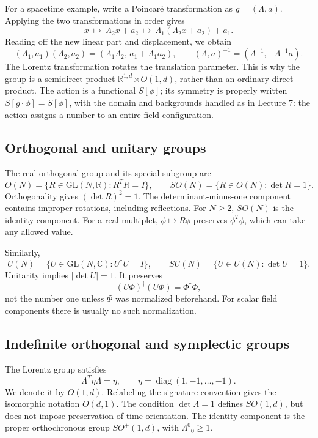 \documentclass[11pt]{article}
\newcommand{\R}{\mathbb{R}}
\newcommand{\C}{\mathbb C}
\newcommand{\GL}{\mathrm{GL}}
\begin{document}
For a spacetime example, write a Poincar\'e transformation as
\(g=(\Lambda,a)\). Applying the two transformations in order gives
\[
 x\ \longmapsto\ \Lambda_2x+a_2
 \ \longmapsto\ \Lambda_1(\Lambda_2x+a_2)+a_1.
\]
Reading off the new linear part and displacement, we obtain
\begin{equation}
(\Lambda_1,a_1)(\Lambda_2,a_2)
=(\Lambda_1\Lambda_2,\,a_1+\Lambda_1a_2),\qquad
(\Lambda,a)^{-1}=(\Lambda^{-1},-\Lambda^{-1}a).
\label{eq:PoincareProduct}
\end{equation}
The Lorentz transformation rotates the translation parameter. This is
why the group is a semidirect product
\(\R^{1,d}\rtimes O(1,d)\), rather than an ordinary direct product.
The action is a functional \(S[\phi]\); its symmetry is properly written
\(S[g\cdot\phi]=S[\phi]\), with the domain and backgrounds handled
as in Lecture 7: the action assigns a number to an entire field
configuration.

\subsection{Orthogonal and unitary groups}
The real orthogonal group and its special subgroup are
\begin{equation}
O(N)=\{R\in\GL(N,\R):R^TR=I\},\qquad
SO(N)=\{R\in O(N):\det R=1\}.
\end{equation}
Orthogonality gives \((\det R)^2=1\). The determinant-minus-one
component contains improper rotations, including reflections. For
\(N\ge2\), \(SO(N)\) is the identity component. For a real multiplet, \(\phi\mapsto R\phi\) preserves
\(\phi^T\phi\), which can take any allowed value.

Similarly,
\begin{equation}
U(N)=\{U\in\GL(N,\C):U^\dagger U=I\},\qquad
SU(N)=\{U\in U(N):\det U=1\}.
\end{equation}
Unitarity implies \(|\det U|=1\). It preserves
\begin{equation}
(U\Phi)^\dagger(U\Phi)=\Phi^\dagger\Phi,
\end{equation}
not the number one unless \(\Phi\) was normalized beforehand.
For scalar field components there is usually no such normalization.

\subsection{Indefinite orthogonal and symplectic groups}
The Lorentz group satisfies
\begin{equation}
\Lambda^T\eta\Lambda=\eta,\qquad
\eta=\operatorname{diag}(1,-1,\ldots,-1).
\end{equation}
We denote it by \(O(1,d)\). Relabeling the signature convention gives
the isomorphic notation \(O(d,1)\). The condition \(\det\Lambda=1\)
defines \(SO(1,d)\), but does not impose preservation of time orientation.
The identity component is the proper orthochronous group
\(SO^+(1,d)\), with \(\Lambda^0{}_0\ge1\).
\end{document}
